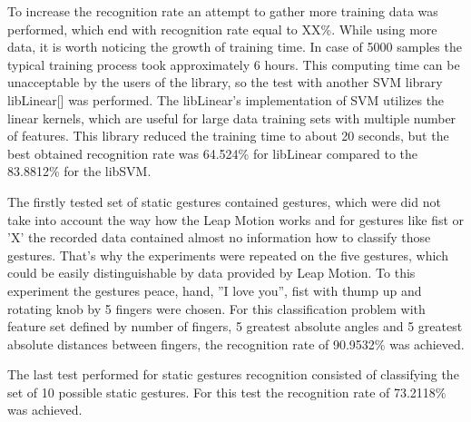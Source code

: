 To increase the recognition rate an attempt to gather more training data was performed, which end with recognition rate equal to XX\%. 
While using more data, it is worth noticing the growth of training time. In case of 5000 samples the typical training process took approximately 6 hours. 
This computing time can be unacceptable by the users of the library, so the test with another SVM library libLinear[] was performed. 
The libLinear's implementation of SVM utilizes the linear kernels, which are useful for large data training sets with multiple number of features. 
This library reduced the training time to about 20 seconds, but the best obtained recognition rate was 64.524\% for libLinear compared to the 83.8812\% for the libSVM.


The firstly tested set of static gestures contained gestures, which were did not take into account the way how the Leap Motion works and for gestures like fist or 'X' the recorded data contained almost no information how to classify those gestures.
That's why the experiments were repeated on the five gestures, which could be easily distinguishable by data provided by Leap Motion. To this experiment the gestures peace, hand, ''I love you'', fist with thump up and rotating knob by 5 fingers were chosen.
For this classification problem with feature set defined by number of fingers, 5 greatest absolute angles and 5 greatest absolute distances between fingers, the recognition rate of 90.9532\% was achieved. 

The last test performed for static gestures recognition consisted of classifying the set of 10 possible static gestures. For this test the recognition rate of 73.2118\% was achieved.

